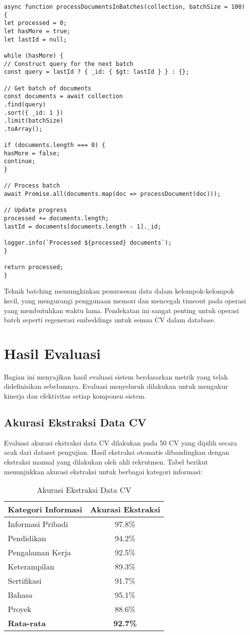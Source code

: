\begin{verbatim}
async function processDocumentsInBatches(collection, batchSize = 100) {
let processed = 0;
let hasMore = true;
let lastId = null;

while (hasMore) {
// Construct query for the next batch
const query = lastId ? { _id: { $gt: lastId } } : {};

// Get batch of documents
const documents = await collection
.find(query)
.sort({ _id: 1 })
.limit(batchSize)
.toArray();

if (documents.length === 0) {
hasMore = false;
continue;
}

// Process batch
await Promise.all(documents.map(doc => processDocument(doc)));

// Update progress
processed += documents.length;
lastId = documents[documents.length - 1]._id;

logger.info(`Processed ${processed} documents`);
}

return processed;
}
\end{verbatim}

Teknik batching memungkinkan pemrosesan data dalam kelompok-kelompok kecil, yang mengurangi penggunaan memori dan mencegah timeout pada operasi yang membutuhkan waktu lama. Pendekatan ini sangat penting untuk operasi batch seperti regenerasi embeddings untuk semua CV dalam database.

\section{Hasil Evaluasi}
Bagian ini menyajikan hasil evaluasi sistem berdasarkan metrik yang telah didefinisikan sebelumnya. Evaluasi menyeluruh dilakukan untuk mengukur kinerja dan efektivitas setiap komponen sistem.

\subsection{Akurasi Ekstraksi Data CV}
Evaluasi akurasi ekstraksi data CV dilakukan pada 50 CV yang dipilih secara acak dari dataset pengujian. Hasil ekstraksi otomatis dibandingkan dengan ekstraksi manual yang dilakukan oleh ahli rekrutmen. Tabel berikut menunjukkan akurasi ekstraksi untuk berbagai kategori informasi:

\begin{table}[h]
\centering
\begin{tabular}{|l|c|}
\hline
\textbf{Kategori Informasi} & \textbf{Akurasi Ekstraksi} \\
\hline
Informasi Pribadi & 97.8\% \\
Pendidikan & 94.2\% \\
Pengalaman Kerja & 92.5\% \\
Keterampilan & 89.3\% \\
Sertifikasi & 91.7\% \\
Bahasa & 95.1\% \\
Proyek & 88.6\% \\
\hline
\textbf{Rata-rata} & \textbf{92.7\%} \\
\hline
\end{tabular}
\caption{Akurasi Ekstraksi Data CV}
\end{table}

